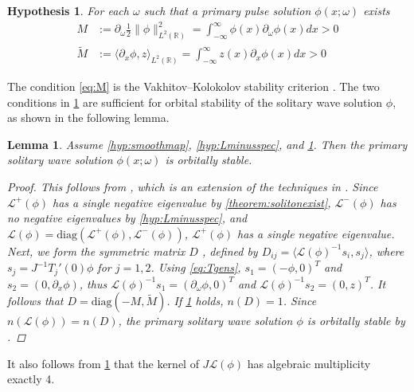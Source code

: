 \documentclass[12pt]{elsarticle}
\def\R{{\mathbb R}}
\def\calL{{\mathcal L}}
\newtheorem{lemma}{Lemma}
\newtheorem{hypothesis}{Hypothesis}
\begin{document}
\begin{hypothesis}\label{hyp:Mcond}
For each $\omega$ such that a primary pulse solution $\phi(x; \omega)$ exists
\begin{align}
M &:= \partial_\omega \frac{1}{2} \| \phi \|_{L^2(\R)}^2
= \int_{-\infty}^\infty \phi(x) \partial_\omega \phi(x) dx > 0 \label{eq:M} \\
\tilde{M} &:= \langle \partial_x \phi, z \rangle_{L^2(\R)} = \int_{-\infty}^\infty z(x) \partial_x \phi(x) dx > 0 \label{eq:tildeM}
\end{align}
\end{hypothesis}

The condition \cref{eq:M} is the Vakhitov–Kolokolov stability criterion \cite{Vakhitov1973}. The two conditions in \cref{hyp:Mcond} are sufficient for orbital stability of the solitary wave solution $\phi$, as shown in the following lemma.

\begin{lemma}\label{lemma:stability}
Assume \cref{hyp:smoothmap}, \cref{hyp:Lminusspec}, and \cref{hyp:Mcond}. Then the primary solitary wave solution $\phi(x; \omega)$ is orbitally stable.
\begin{proof}
This follows from \cite[Section 5.2.2]{Kapitula2013}, which is an extension of the techniques in \cite{Grillakis1990}. Since $\calL^+(\phi)$ has a single negative eigenvalue by \cref{theorem:solitonexist}, $\calL^-(\phi)$ has no negative eigenvalues by \cref{hyp:Lminusspec}, and $\calL(\phi) = \text{diag}(\calL^+(\phi), \calL^-(\phi))$, $\calL^+(\phi)$ has a single negative eigenvalue. Next, we form the symmetric matrix $D$ \cite[5.2.53]{Kapitula2013}, defined by 
$D_{ij} = \langle \calL(\phi)^{-1} s_i, s_j \rangle$, where $s_j = J^{-1} T_j'(0) \phi$ for $j = 1, 2$. Using \cref{eq:Tgens}, $s_1 = (-\phi, 0)^T$ and $s_2 = (0, \partial_x \phi)$, thus $\calL(\phi)^{-1} s_1 = (\partial_\omega \phi, 0)^T$ and $\calL(\phi)^{-1} s_2 = (0, z)^T$. It follows that $D = \text{diag}(-M, \tilde{M})$. If \cref{hyp:Mcond} holds, $n(D) = 1$. Since $n(\calL(\phi)) = n(D)$, the primary solitary wave solution $\phi$ is orbitally stable by \cite[Theorem5.2.11]{Kapitula2013}.
\end{proof}
\end{lemma}

It also follows from \cref{hyp:Mcond} that the kernel of $J \calL(\phi)$ has algebraic multiplicity exactly 4.
\end{document}
